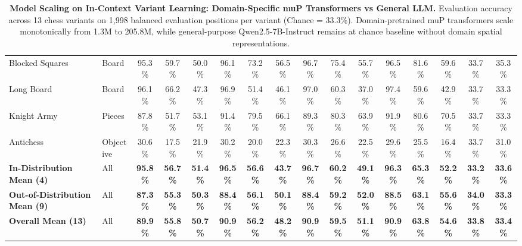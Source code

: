 \begin{table}[t]
\begin{tabular}{ll|ccc|ccc|ccc|ccc|cc}
Blocked Squares    & Board     &  95.3\% &  59.7\% &  50.0\% &  96.1\% &  73.2\% &  56.5\% &  96.7\% &  75.4\% &  55.7\% &  96.5\% &  81.6\% &  59.6\% &  33.7\% &  35.3\% \\
Long Board         & Board     &  96.1\% &  66.2\% &  47.3\% &  96.9\% &  51.4\% &  46.1\% &  97.0\% &  60.3\% &  37.0\% &  97.4\% &  59.6\% &  42.9\% &  33.7\% &  33.3\% \\
Knight Army        & Pieces    &  87.8\% &  51.7\% &  53.1\% &  91.4\% &  79.5\% &  66.1\% &  89.3\% &  80.3\% &  63.9\% &  91.9\% &  80.6\% &  70.5\% &  33.7\% &  33.3\% \\
Antichess          & Objective &  30.6\% &  17.5\% &  21.9\% &  30.2\% &  20.0\% &  22.3\% &  30.3\% &  26.6\% &  22.5\% &  29.6\% &  25.5\% &  16.4\% &  33.7\% &  31.0\% \\
\midrule
\textbf{In-Distribution Mean (4)} & All & \textbf{ 95.8\%} & \textbf{ 56.7\%} & \textbf{ 51.4\%} & \textbf{ 96.5\%} & \textbf{ 56.6\%} & \textbf{ 43.7\%} & \textbf{ 96.7\%} & \textbf{ 60.2\%} & \textbf{ 49.1\%} & \textbf{ 96.3\%} & \textbf{ 65.3\%} & \textbf{ 52.2\%} & \textbf{ 33.2\%} & \textbf{ 33.6\%} \\
\textbf{Out-of-Distribution Mean (9)} & All & \textbf{ 87.3\%} & \textbf{ 55.3\%} & \textbf{ 50.3\%} & \textbf{ 88.4\%} & \textbf{ 56.1\%} & \textbf{ 50.1\%} & \textbf{ 88.4\%} & \textbf{ 59.2\%} & \textbf{ 52.0\%} & \textbf{ 88.5\%} & \textbf{ 63.1\%} & \textbf{ 55.6\%} & \textbf{ 34.0\%} & \textbf{ 33.3\%} \\
\textbf{Overall Mean (13)} & All & \textbf{ 89.9\%} & \textbf{ 55.8\%} & \textbf{ 50.7\%} & \textbf{ 90.9\%} & \textbf{ 56.2\%} & \textbf{ 48.2\%} & \textbf{ 90.9\%} & \textbf{ 59.5\%} & \textbf{ 51.1\%} & \textbf{ 90.9\%} & \textbf{ 63.8\%} & \textbf{ 54.6\%} & \textbf{ 33.8\%} & \textbf{ 33.4\%} \\
\bottomrule
\end{tabular}
\caption{\textbf{Model Scaling on In-Context Variant Learning: Domain-Specific muP Transformers vs General LLM.} Evaluation accuracy across 13 chess variants on 1,998 balanced evaluation positions per variant (Chance = 33.3\%). Domain-pretrained muP transformers scale monotonically from 1.3M to 205.8M, while general-purpose Qwen2.5-7B-Instruct remains at chance baseline without domain spatial representations.}
\label{tab:mup_scaling}
\end{table}
